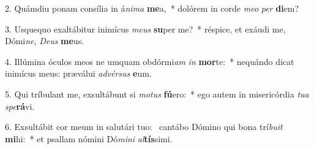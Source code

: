 2. Quámdiu ponam consília in á\textit{ni}\textit{ma} \textbf{me}a,~*  dolórem in corde \textit{me}\textit{o} \textit{per} \textbf{di}em?\

3. Usquequo exaltábitur inimícus \textit{me}\textit{us} \textbf{su}per me?~*  réspice, et exáudi me, Dómi\textit{ne}, \textit{De}\textit{us} \textbf{me}us.\

4. Illúmina óculos meos ne umquam obdórmi\textit{am} \textit{in} \textbf{mor}te:~*  nequándo dicat inimícus meus: præválui \textit{ad}\textit{vér}\textit{sus} \textbf{e}um.\

5. Qui tríbulant me, exsultábunt si \textit{mo}\textit{tus} \textbf{fú}ero:~*  ego autem in misericórdia \textit{tu}\textit{a} \textit{spe}\textbf{rá}vi.\

6. Exsultábit cor meum in salutári tuo: \dag\  cantábo Dómino qui bona trí\textit{bu}\textit{it} \textbf{mi}hi:~*  et psallam nómini Dó\textit{mi}\textit{ni} \textit{al}\textbf{tís}simi.\

